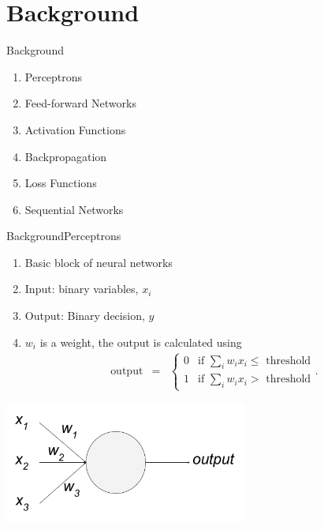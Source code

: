 \documentclass[handout]{beamer}
\begin{document}
\section{Background}
\begin{frame}{Background}
  \begin{enumerate}
    \item Perceptrons
    \item Feed-forward Networks
    \item Activation Functions
    \item Backpropagation
    \item Loss Functions
    \item Sequential Networks
  \end{enumerate}
\end{frame}

\begin{frame}{Background}{Perceptrons}
\begin{enumerate}
  \item Basic block of neural networks \\

  \item Input: binary variables, $x_i$ \\

  \item Output: Binary decision, $y$ \\

  \item $w_i$ is a weight, the output is calculated using \\

  \begin{eqnarray}
  \mbox{output} & = & \left\{ \begin{array}{ll}
      0 & \mbox{if } \sum_i w_i x_i \leq \mbox{ threshold} \\
      1 & \mbox{if } \sum_i w_i x_i > \mbox{ threshold}
      \end{array} .
\end{eqnarray}
\end{enumerate}
    \begin{center}
      \includegraphics[width=0.8\linewidth, height=4cm]{images/perceptron}
    \end{center}
\end{frame}
\end{document}
